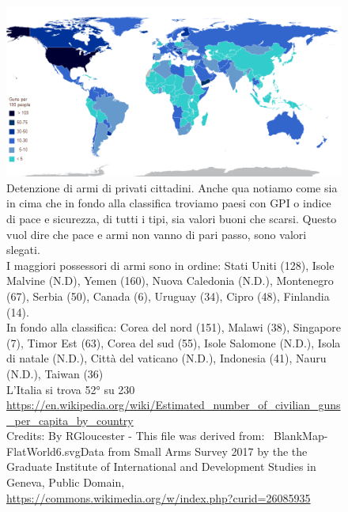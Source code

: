 \documentclass[12pt]{book} %
\begin{document}
\begin{figure}[H]
  \begin{minipage}{17cm}
    \includegraphics[width=17cm]{images/Libro-img036.png}
    \caption{Detenzione di armi di privati cittadini. Anche qua notiamo
come sia in cima che in fondo alla classifica troviamo paesi con GPI o indice di pace e sicurezza, di tutti i tipi, sia
valori buoni che scarsi. Questo vuol dire che pace e armi non vanno di pari passo, sono valori slegati.\\
I maggiori possessori di armi sono in ordine: Stati Uniti (128), Isole Malvine (N.D), Yemen (160), Nuova Caledonia
(N.D.), Montenegro (67), Serbia (50), Canada (6), Uruguay (34), Cipro (48), Finlandia (14). \\
In fondo alla classifica: Corea del nord (151), Malawi (38), Singapore (7), Timor Est (63), Corea del sud (55), Isole
Salomone (N.D.), Isola di natale (N.D.), Città del vaticano (N.D.), Indonesia (41), Nauru (N.D.), Taiwan (36)\\
L'Italia si trova 52° su 230\\
\protect\url{https://en.wikipedia.org/wiki/Estimated\_number\_of\_civilian\_guns\_per\_capita\_by\_country} \\
Credits: By RGloucester - This file was derived from: \ BlankMap-FlatWorld6.svgData from Small Arms Survey 2017 by the
the Graduate Institute of International and Development Studies in Geneva, Public Domain,
\protect\url{https://commons.wikimedia.org/w/index.php?curid=26085935} }
  \end{minipage}
\end{figure}
\end{document}
